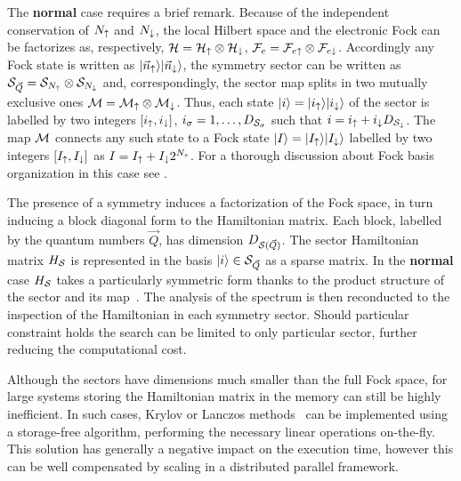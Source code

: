 \documentclass[edipack2.tex]{subfiles}
\begin{document}
The {\bf normal} case requires a brief remark. Because of the
independent conservation of $N_\uparrow$ and $N_\downarrow$, the local Hilbert
space and the electronic Fock can be factorizes as, respectively,
${\cal H}={\cal H}_\uparrow\otimes{\cal H}_\downarrow$, ${\cal F}_e = {\cal F}_{e\uparrow}\otimes {\cal F}_{e\downarrow}$.  
Accordingly any Fock state is written as $|\vec{n}_\uparrow\rangle|\vec{n}_\downarrow\rangle$, the symmetry sector can be written as  ${\cal S}_{\vec{Q}} = {\cal S}_{N_\uparrow}\otimes
{\cal S}_{N_\downarrow}$ and, correspondingly, the sector map splits in two
mutually exclusive ones ${\cal M} = {\cal M}_\uparrow
\otimes {\cal M}_\downarrow$.
Thus, each state $|i\rangle=|i_\uparrow\rangle|i_\downarrow\rangle$ of the
sector is labelled by two integers $[i_\uparrow,i_\downarrow]$, 
$i_\sigma=1,\dots,D_{{\cal S}_\sigma}$ such that $i=i_\uparrow + i_\downarrow
D_{{\cal S}_\downarrow}$. The map ${\cal M}$ connects any such state to a Fock state
$|I\rangle=|I_\uparrow\rangle|I_\downarrow\rangle$ labelled by two integers
$[I_\uparrow,I_\downarrow]$ as $I=I_\uparrow +   I_\downarrow 2^{N_s}$. For a thorough
discussion about Fock basis organization in this case see
. 

The presence of a symmetry induces a factorization of the Fock space,
in turn inducing a block diagonal form to the Hamiltonian matrix.
Each block, labelled by the quantum numbers $\vec{Q}$, has dimension
$D_{{\cal S}(\vec{Q})}$. The sector Hamiltonian matrix $H_{\cal S}$ is represented in the
basis $|i\rangle\in{\cal S}_{\vec{Q}}$ as a sparse matrix. In the {\bf
  normal} case $H_{\cal S}$ takes a particularly symmetric form thanks to
the product structure of the sector and its map~\cite{Amaricci2022}.
The analysis of the spectrum is then reconducted to the inspection of
the Hamiltonian in each symmetry sector. Should particular constraint
holds the search can be limited to only particular sector, further
reducing the computational cost. 

Although the sectors have dimensions much smaller than the full Fock
space, for large systems storing the Hamiltonian matrix in the memory
can still be highly inefficient.
In such cases, Krylov or Lanczos methods~\cite{Lanczos1950JRNBSB,Lin1993CIP,Lehoucq1998,Maschhoff1996} can
be implemented using a storage-free algorithm, performing the
necessary linear operations on-the-fly.
This solution has generally a negative impact on the execution
time, however this can be well compensated by scaling in a distributed 
parallel framework.
\end{document}
